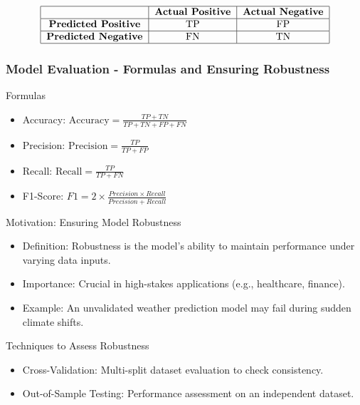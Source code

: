\documentclass[aspectratio=169]{beamer}
\begin{document}
\begin{frame}[fragile]
    \begin{figure}[h]
        \centering
        \begin{equation}
            \begin{tabular}{|c|c|c|}
                \hline
                & \textbf{Actual Positive} & \textbf{Actual Negative} \\
                \hline
                \textbf{Predicted Positive} & TP & FP \\
                \hline
                \textbf{Predicted Negative} & FN & TN \\
                \hline
            \end{tabular}
        \end{equation}
    \end{figure}
\end{frame}

\begin{frame}[fragile]
    \frametitle{Model Evaluation - Formulas and Ensuring Robustness}
    
    \begin{block}{Formulas}
        \begin{itemize}
            \item Accuracy: \( \text{Accuracy} = \frac{TP + TN}{TP + TN + FP + FN} \)
            \item Precision: \( \text{Precision} = \frac{TP}{TP + FP} \)
            \item Recall: \( \text{Recall} = \frac{TP}{TP + FN} \)
            \item F1-Score: \( F1 = 2 \times \frac{Precision \times Recall}{Precision + Recall} \)
        \end{itemize}
    \end{block}
    
    \begin{block}{Motivation: Ensuring Model Robustness}
        \begin{itemize}
            \item Definition: Robustness is the model's ability to maintain performance under varying data inputs.
            \item Importance: Crucial in high-stakes applications (e.g., healthcare, finance).
            \item Example: An unvalidated weather prediction model may fail during sudden climate shifts.
        \end{itemize}
    \end{block}
    
    \begin{block}{Techniques to Assess Robustness}
        \begin{itemize}
            \item Cross-Validation: Multi-split dataset evaluation to check consistency.
            \item Out-of-Sample Testing: Performance assessment on an independent dataset.
        \end{itemize}
    \end{block}
\end{frame}
\end{document}
